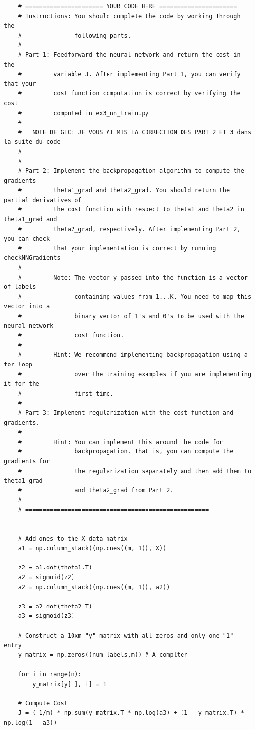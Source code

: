 \begin{lstlisting}
    # ====================== YOUR CODE HERE ======================
    # Instructions: You should complete the code by working through the
    #               following parts.
    #
    # Part 1: Feedforward the neural network and return the cost in the
    #         variable J. After implementing Part 1, you can verify that your
    #         cost function computation is correct by verifying the cost
    #         computed in ex3_nn_train.py
    #
    #	NOTE DE GLC: JE VOUS AI MIS LA CORRECTION DES PART 2 ET 3 dans la suite du code
    #   
    #
    # Part 2: Implement the backpropagation algorithm to compute the gradients
    #         theta1_grad and theta2_grad. You should return the partial derivatives of
    #         the cost function with respect to theta1 and theta2 in theta1_grad and
    #         theta2_grad, respectively. After implementing Part 2, you can check
    #         that your implementation is correct by running checkNNGradients
    #
    #         Note: The vector y passed into the function is a vector of labels
    #               containing values from 1...K. You need to map this vector into a 
    #               binary vector of 1's and 0's to be used with the neural network
    #               cost function.
    #
    #         Hint: We recommend implementing backpropagation using a for-loop
    #               over the training examples if you are implementing it for the 
    #               first time.
    #
    # Part 3: Implement regularization with the cost function and gradients.
    #
    #         Hint: You can implement this around the code for
    #               backpropagation. That is, you can compute the gradients for
    #               the regularization separately and then add them to theta1_grad
    #               and theta2_grad from Part 2.
    #
    # ====================================================

    
    # Add ones to the X data matrix
    a1 = np.column_stack((np.ones((m, 1)), X))

    z2 = a1.dot(theta1.T)
    a2 = sigmoid(z2)
    a2 = np.column_stack((np.ones((m, 1)), a2))

    z3 = a2.dot(theta2.T)
    a3 = sigmoid(z3)
    
    # Construct a 10xm "y" matrix with all zeros and only one "1" entry
    y_matrix = np.zeros((num_labels,m)) # A complter

    for i in range(m):
        y_matrix[y[i], i] = 1

    # Compute Cost
    J = (-1/m) * np.sum(y_matrix.T * np.log(a3) + (1 - y_matrix.T) * np.log(1 - a3))
\end{lstlisting}


